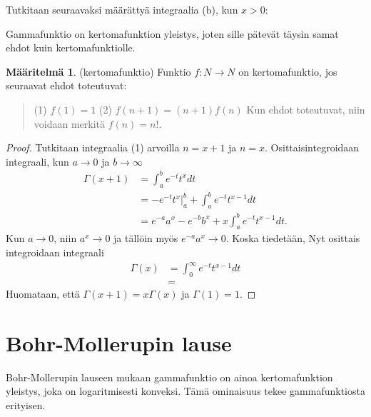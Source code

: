 \documentclass[12pt]{article}
\theoremstyle{definition}
\newtheorem{maar}{Määritelmä}
\theoremstyle{plain}
\begin{document}
Tutkitaan seuraavaksi määrättyä integraalia (b), kun $x>0$: \newline


Gammafunktio on kertomafunktion yleistys, joten sille pätevät täysin samat ehdot kuin kertomafunktiolle. 

\begin{maar}
(kertomafunktio)
Funktio $f: N \rightarrow N$ on kertomafunktio, jos seuraavat ehdot toteutuvat:


\begin{quote}
    (1) $f(1)=1$ \newline
    (2) $f(n+1)=(n+1)f(n)$ \newline
    Kun ehdot toteutuvat, niin voidaan merkitä $f(n)=n!$.
\end{quote}
\end{maar}

\begin{proof}
Tutkitaan integraalia (1) arvoilla $n=x+1$ ja $n=x$. \newline
Osittaisintegroidaan integraali, kun $a\rightarrow0$ ja $b\rightarrow\infty$
\begin{align*}
    \Gamma(x+1) & = \int_{a}^{b} e^{-t} t^{x} dt \\
    & = -e^{-t}t^{x}\Big|_a^b+\int_a^b e^{-t}t^{x-1}dt \\
    & = e^{-a}a^{x}-e^{-b}b^{x}+x\int_a^be^{-t}t^{x-1}dt.
\end{align*}
Kun $a\rightarrow0$, niin $a^x\rightarrow0$ ja tällöin myös $e^{-a}a^x \rightarrow0$. Koska tiedetään,   \newline
Nyt osittais integroidaan integraali \newline
\begin{align*}
    \Gamma(x) & = \int_{0}^{\infty} e^{-t} t^{x-1} dt \\
& =
\end{align*}
Huomataan, että $\Gamma(x+1) = x\Gamma(x)$ ja $\Gamma(1) = 1.$
\end{proof}

\newpage




\section{Bohr-Mollerupin lause}
\onehalfspacing
Bohr-Mollerupin lauseen mukaan gammafunktio on ainoa kertomafunktion yleistys, joka on logaritmisesti konveksi. Tämä ominaisuus tekee gammafunktiosta erityisen.
\newline
\end{document}
